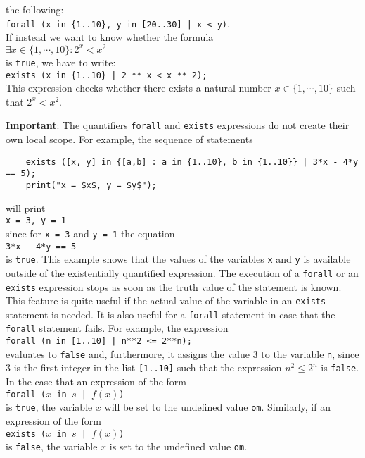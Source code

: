 the following:
\\[0.2cm]
\hspace*{1.3cm}
\texttt{forall (x in \{1..10\}, y in [20..30] | x < y)}.
\\[0.2cm]
If instead we want to know whether the formula
\\[0.2cm]
\hspace*{1.3cm}
$\exists x \in \{ 1, \cdots, 10 \}: 2^x < x^2$
\\[0.2cm]
is \texttt{true}, we have to write:
\\[0.2cm]
\hspace*{1.3cm}
\texttt{exists (x in \{1..10\} | 2 ** x < x ** 2);}
\\[0.2cm]
This expression checks whether there exists a natural number $x \in \{1, \cdots, 10\}$
such that $2^x< x^2$.
\vspace*{0.3cm}

\noindent
\textbf{Important}:  The quantifiers \texttt{forall} and \texttt{exists} expressions do \underline{not}
create their own local scope.  For example, the sequence of statements
\begin{verbatim}
    exists ([x, y] in {[a,b] : a in {1..10}, b in {1..10}} | 3*x - 4*y == 5);
    print("x = $x$, y = $y$");
\end{verbatim}
will print
\\[0.2cm]
\hspace*{1.3cm}
\texttt{x = 3, y = 1}
\\[0.2cm]
since for \texttt{x = 3} and \texttt{y = 1} the equation
\\[0.2cm]
\hspace*{1.3cm}
\texttt{3*x - 4*y == 5}
\\[0.2cm]
is \texttt{true}.
This example shows that the values of the variables \texttt{x} and \texttt{y} is available
outside of the existentially quantified expression.  The execution of
a \texttt{forall} or an \texttt{exists} expression stops as soon as the
truth value of the statement is known.
This feature is quite useful if the actual value of the variable in an \texttt{exists}
statement is needed.  It is also useful for a \texttt{forall} statement in case that the
\texttt{forall} statement fails.  For example, the expression
\\[0.2cm]
\hspace*{1.3cm}
\texttt{forall (n in [1..10] | n**2 <= 2**n);}
\\[0.2cm]
evaluates to \texttt{false} and, furthermore, it assigns the value $3$ to the variable \texttt{n},
since $3$ is the first integer in the list \texttt{[1..10]}
such that the expression $n^2 \leq 2^n$ is \texttt{false}.  In the case that an expression of the form
\\[0.2cm]
\hspace*{1.3cm}
\texttt{forall ($x$ in $s$ | $f(x)$)}
\\[0.2cm]
is \texttt{true},  the variable $x$ will be set to the undefined value \texttt{om}.  Similarly, if an
expression of the form
\\[0.2cm]
\hspace*{1.3cm}
\texttt{exists ($x$ in $s$ | $f(x)$)}
\\[0.2cm]
is \texttt{false}, the variable $x$ is set  to the undefined value \texttt{om}.

